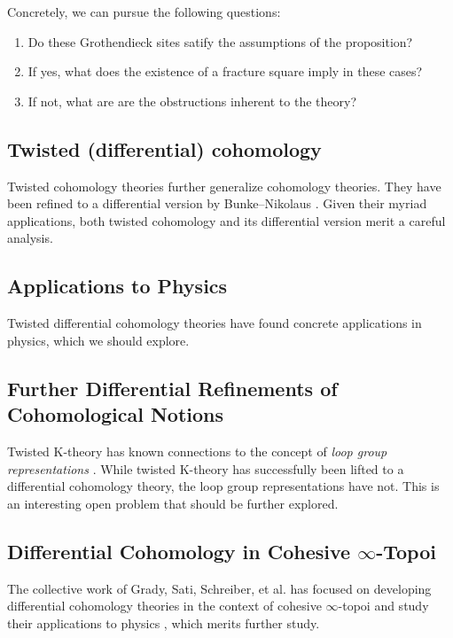 \documentclass[10pt]{amsart}
\begin{document}
Concretely, we can pursue the following questions:
\begin{enumerate}
  \item Do these Grothendieck sites satify the assumptions of the proposition?
  \item If yes, what does the existence of a fracture square imply in these cases?
  \item If not, what are are the obstructions inherent to the theory?
\end{enumerate}

\subsection{Twisted (differential) cohomology}
Twisted cohomology theories further generalize cohomology theories. They have been refined to a differential version by Bunke--Nikolaus \cite{bunkenikolaus2019twisted}. Given their myriad applications, both twisted cohomology and its differential version merit a careful analysis.

\subsection{Applications to Physics}
Twisted differential cohomology theories have found concrete applications in physics, which we should explore.

\subsection{Further Differential Refinements of Cohomological Notions}
Twisted K-theory has known connections to the concept of \emph{loop group representations} \cite{freedhopkinsteleman2011loopgroupsi}. While twisted K-theory has successfully been lifted to a differential cohomology theory, the loop group representations have not. This is an interesting open problem that should be further explored.


\subsection{Differential Cohomology in Cohesive \texorpdfstring{$\infty$}{oo}-Topoi}
The collective work of Grady, Sati, Schreiber, et al. has focused on developing differential cohomology theories in the context of cohesive $\infty$-topoi and study their applications to physics \cite{schreiber2013cohesive,fiorenzasatischreiber2024charactermap}, which merits further study.
  

{\footnotesize


}
\end{document}

